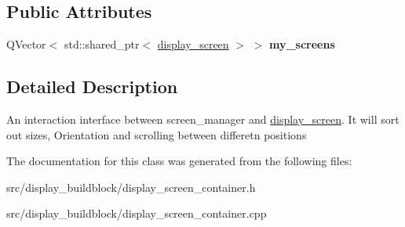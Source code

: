 \subsection*{Public Attributes}
\begin{DoxyCompactItemize}
\item 
\mbox{\label{classdisplay__screen__container_a44ac856ccf56e16f62714678fa6664a4}} 
Q\+Vector$<$ std\+::shared\+\_\+ptr$<$ \mbox{\hyperlink{classdisplay__screen}{display\+\_\+screen}} $>$ $>$ {\bfseries my\+\_\+screens}
\end{DoxyCompactItemize}


\subsection{Detailed Description}
An interaction interface between screen\+\_\+manager and \mbox{\hyperlink{classdisplay__screen}{display\+\_\+screen}}. It will sort out sizes, Orientation and scrolling between differetn positions 

The documentation for this class was generated from the following files\+:\begin{DoxyCompactItemize}
\item 
src/display\+\_\+buildblock/display\+\_\+screen\+\_\+container.\+h\item 
src/display\+\_\+buildblock/display\+\_\+screen\+\_\+container.\+cpp\end{DoxyCompactItemize}

